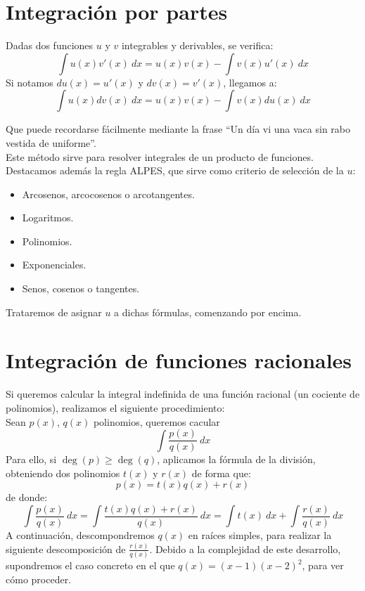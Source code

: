 \section{Integración por partes}
\begin{prop}
    Dadas dos funciones $u$ y $v$ integrables y derivables, se verifica:
    \begin{equation*}
        \displaystyle\int u(x) v'(x)~dx  = u(x)v(x) - \displaystyle\int v(x)u'(x)~dx 
    \end{equation*}
    Si notamos $du(x) = u'(x)$ y $dv(x) = v'(x)$, llegamos a:
    \begin{equation*}
        \displaystyle\int u(x)dv(x)~dx  = u(x)v(x) - \displaystyle\int v(x)du(x)~dx 
    \end{equation*}
\end{prop}
Que puede recordarse fácilmente mediante la frase ``Un día vi una vaca sin rabo vestida de uniforme''.\\

\noindent
Este método sirve para resolver integrales de un producto de funciones.\\

\noindent
Destacamos además la regla ALPES\@, que sirve como criterio de selección de la $u$:
\begin{itemize}
    \item Arcosenos, arcocosenos o arcotangentes.
    \item Logaritmos.
    \item Polinomios.
    \item Exponenciales.
    \item Senos, cosenos o tangentes.
\end{itemize}
Trataremos de asignar $u$ a dichas fórmulas, comenzando por encima.

\section{Integración de funciones racionales}
Si queremos calcular la integral indefinida de una función racional (un cociente de polinomios), realizamos el siguiente procedimiento:\\

\noindent
Sean $p(x)$, $q(x)$ polinomios, queremos cacular
\begin{equation*}
    \displaystyle\int \frac{p(x)}{q(x)}~dx 
\end{equation*}
Para ello, si $\deg(p) \geq \deg(q)$, aplicamos la fórmula de la división, obteniendo dos polinomios $t(x)$ y $r(x)$ de forma que:
\begin{equation*}
    p(x) = t(x)q(x) + r(x)
\end{equation*}
de donde:
\begin{equation*}
    \displaystyle\int \frac{p(x)}{q(x)}~dx  = \displaystyle\int \frac{t(x)q(x)+r(x)}{q(x)}~dx = \displaystyle\int t(x)~dx  + \displaystyle\int \frac{r(x)}{q(x)}~dx 
\end{equation*}
A continuación, descompondremos $q(x)$ en raíces simples, para realizar la siguiente descomposición de $\frac{r(x)}{q(x)}$. Debido a la complejidad de este desarrollo, supondremos el caso concreto en el que $q(x) = (x-1){(x-2)}^2$, para ver cómo proceder.

